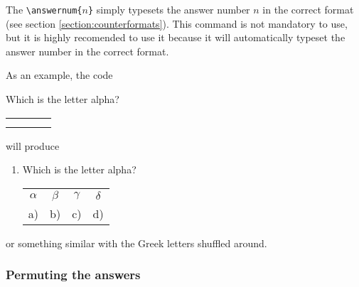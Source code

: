 \documentclass{article}
\begin{document}
The \verb$\answernum{$$n$\verb$}$ simply typesets the answer number $n$ in the correct format (see section \ref{section:counterformats}). This command is not mandatory to use, but it is highly recomended to use it because it will automatically typeset the answer number in the correct format. 

As an example, the code
\begin{code}
\question Which is the letter alpha?
          \begin{mcanswers}
          \begin{tabular}{cccc}
          \answer{1}{\Huge$\alpha$} & 
          \answer{2}{\Huge$\beta$}  & 
          \answer{3}{\Huge$\gamma$} & 
          \answer{4}{\Huge$\delta$} \\[0.1\baselineskip]
          \answernum{1} &
          \answernum{2} &
          \answernum{3} &
          \answernum{4} \\
          \end{tabular} 
          \end{mcanswers}
\end{code}
will produce 
\begin{enumerate}[label=\arabic{*}.,itemsep=1\baselineskip]
 \item Which is the letter alpha?\par
   \begin{tabular}{cccc}
   \Huge$\alpha$&\Huge$\beta$&\Huge$\gamma$&\Huge$\delta$\\[0.1\baselineskip]
   a)&b)&c)&d)\\
   \end{tabular} 
\end{enumerate}
or something similar with the Greek letters shuffled around.






\subsubsection{Permuting the answers}
\end{document}
